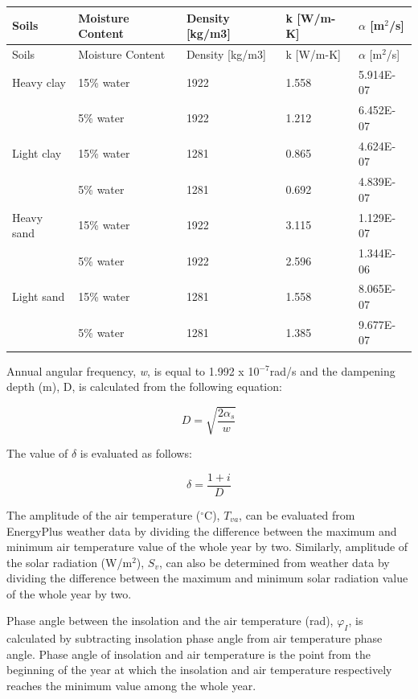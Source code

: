 \begin{longtable}[c]{>{\raggedright}p{1.2in}>{\raggedright}p{1.2in}>{\raggedright}p{1.2in}>{\raggedright}p{1.2in}>{\raggedright}p{1.2in}}
\toprule
Soils & Moisture  Content & Density  [kg/m3] & k  [W/m-K] & \({\alpha}\)   [m\(^2\)/s] \tabularnewline
\midrule
\endfirsthead

\toprule
Soils & Moisture  Content & Density  [kg/m3] & k  [W/m-K] & \({\alpha}\)   [m\(^2\)/s] \tabularnewline
\midrule
\endhead

Heavy clay & 15\% water & 1922 & 1.558 & 5.914E-07 \tabularnewline
 & 5\% water & 1922 & 1.212 & 6.452E-07 \tabularnewline
Light clay & 15\% water & 1281 & 0.865 & 4.624E-07 \tabularnewline
 & 5\% water & 1281 & 0.692 & 4.839E-07 \tabularnewline
Heavy sand & 15\% water & 1922 & 3.115 & 1.129E-07 \tabularnewline
 & 5\% water & 1922 & 2.596 & 1.344E-06 \tabularnewline
Light sand & 15\% water & 1281 & 1.558 & 8.065E-07 \tabularnewline
 & 5\% water & 1281 & 1.385 & 9.677E-07 \tabularnewline
\bottomrule
\end{longtable}

Annual angular frequency, \emph{w}, is equal to 1.992 x 10\(^{-7}\)rad/s and the dampening depth (m), D, is calculated from the following equation:

\begin{equation}
D = \sqrt {\frac{{2{\alpha_s}}}{w}}
\end{equation}

The value of \({\delta}\) is evaluated as follows:

\begin{equation}
\delta  = \frac{{1 + i}}{D}
\end{equation}

The amplitude of the air temperature (\(^{\circ}\)C), \(T_{va}\), can be evaluated from EnergyPlus weather data by dividing the difference between the maximum and minimum air temperature value of the whole year by two. Similarly, amplitude of the solar radiation (W/m\(^{2}\)), \(S_{v}\), can also be determined from weather data by dividing the difference between the maximum and minimum solar radiation value of the whole year by two.

Phase angle between the insolation and the air temperature (rad), \({\varphi_{I}}\), is calculated by subtracting insolation phase angle from air temperature phase angle. Phase angle of insolation and air temperature is the point from the beginning of the year at which the insolation and air temperature respectively reaches the minimum value among the whole year.

